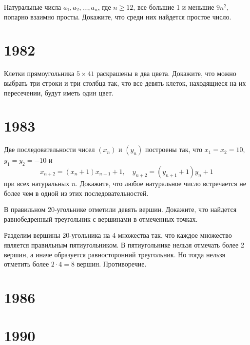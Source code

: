 \documentclass[11pt, a4paper]{template}
\begin{document}
\begin{exercise}
Натуральные числа $a_{1}, a_{2}, \dots, a_{n}$, где $n \geqslant 12$, все большие 1 и меньшие $9n^{2}$, попарно взаимно просты. Докажите, что среди них найдется простое число.
\end{exercise}

\chapter{1982}

\begin{exercise}
Клетки прямоугольника $5 \times 41$ раскрашены в два цвета. Докажите, что можно выбрать три строки и три столбца так, что все девять клеток, находящиеся на их пересечении, будут иметь один цвет.
\end{exercise}

\chapter{1983}

\begin{exercise}
Две последовательности чисел $(x_{n})$ и $(y_{n})$ построены так, что $x_{1} = x_{2} = 10$, $y_{1} = y_{2} = -10$ и
$$
x_{n+2}=(x_{n}+1)x_{n+1}+1, \quad y_{n+2}=(y_{n+1} + 1)y_{n}+1
$$
при всех натуральных $n$. Докажите, что любое натуральное число встречается не более чем в одной из этих последовательностей.
\end{exercise}

\begin{exercise}
В правильном 20-угольнике отметили девять вершин. Докажите, что найдется равнобедренный треугольник с вершинами в отмеченных точках.
\end{exercise}

\begin{solution}
Разделим вершины 20-угольника на 4 множества так, что каждое множество является правильным пятиугольником. В пятиугольнике нельзя отмечать более 2 вершин, а иначе образуется равносторонний треугольник. Но тогда нельзя отметить более $2 \cdot 4 = 8$ вершин. Противоречие.
\end{solution}

\chapter{1986}

\chapter{1990}
\end{document}
